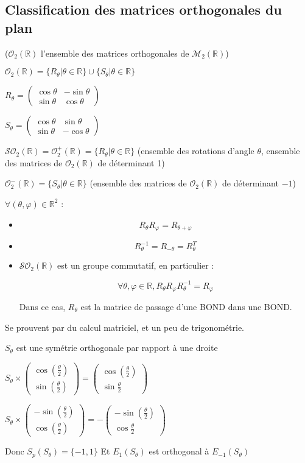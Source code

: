 \documentclass[a4paper,12pt]{book}
\newcommand{\Thr}[2]{\begin{tcolorbox}[sharp corners, colback=white,colframe=red!10!blue!30!green!75!, title=Théorème : #1]#2\end{tcolorbox}}
\newcommand{\Pre}[1]{\begin{tcolorbox}[sharp corners, colback=white,colframe=green!60!green!30!black!75, title=Preuve]#1\end{tcolorbox}}
\def\R{\mathbb{R}}
\begin{document}
\subsection{Classification des matrices orthogonales du plan}
($\mathcal{O}_2(\R)$ l'ensemble des matrices orthogonales de $\mathcal{M}_2(\R)$)
\par $\mathcal{O}_2(\R)=\{R_\theta\vert\theta\in\R\}\cup\{S_\theta\vert\theta\in\R\}$
\par $R_\theta = \begin{pmatrix} \cos\theta & -\sin\theta \\ \sin\theta & \cos\theta \end{pmatrix}$
\par $S_\theta = \begin{pmatrix} \cos\theta & \sin\theta \\ \sin\theta & -\cos\theta\end{pmatrix}$
\par $\mathcal{SO}_2(\R) = \mathcal{O}_2^+(\R) = \{R_\theta\vert\theta\in\R\}$ (ensemble des rotations d'angle $\theta$, ensemble des matrices de $\mathcal{O}_2(\R)$ de déterminant 1)
\par $\mathcal{O}_2^-(\R)=\{S_\theta\vert\theta\in\R\}$ (ensemble des matrices de $\mathcal{O}_2(\R)$ de déterminant $-1$)
\Thr{}{$\forall(\theta,\varphi)\in\R^2$ :\begin{itemize}
\item $$R_\theta R_\varphi = R_{\theta+\varphi}$$
\item $$R_\theta^{-1} = R_{-\theta} =R_\theta^T$$
\item $\mathcal{SO}_2(\R)$ est un groupe commutatif, en particulier :
\par $$\forall \theta,\varphi\in\R, R_\theta R_\varphi R_\theta^{-1}=R_\varphi$$
\par Dans ce cas, $R_\theta$ est la matrice de passage d'une BOND dans une BOND.
\end{itemize}}
\Pre{Se prouvent par du calcul matriciel, et un peu de trigonométrie.}
$S_\theta$ est une symétrie orthogonale par rapport à une droite
\par $S_\theta\times \begin{pmatrix}\cos(\frac{\theta}{2})\\\sin(\frac{\theta}{2})\end{pmatrix} = \begin{pmatrix}\cos(\frac{\theta}{2})\\ \sin\frac{\theta}{2}\end{pmatrix}$
\par $S_\theta\times \begin{pmatrix}-\sin(\frac{\theta}{2})\\\cos(\frac{\theta}{2})\end{pmatrix} = -\begin{pmatrix}-\sin(\frac{\theta}{2})\\ \cos\frac{\theta}{2}\end{pmatrix}$
\par Donc $S_p(S_\theta) = \{-1,1\}$ Et $E_1(S_\theta)$ est orthogonal à $E_{-1}(S_\theta)$
\end{document}
